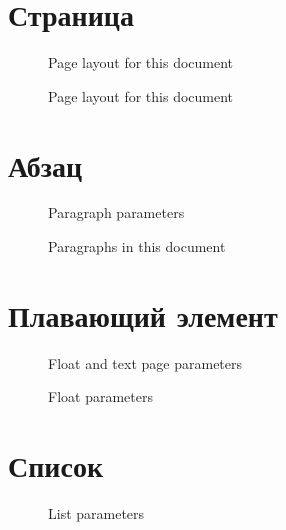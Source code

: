 \documentclass[a4paper,hidelinks,14pt]{extarticle}
\begin{document}
\setuplayouts


\section{Страница}

\begin{figure}
\currentpage
\drawparametersfalse
\drawpage
\caption{Page layout for this document} \label{fig:pplt}
\end{figure}

\begin{figure}
  \currentpage
  \drawparameterstrue
  \drawpage
  \caption{Page layout for this document} \label{fig:ptrs}
\end{figure}

\section{Абзац}

\begin{figure}
\drawparagraph
\caption{Paragraph parameters}\label{fig:fpara}
\end{figure}

\currentparagraph
\begin{figure}
\drawparametersfalse
\drawparagraph
\caption{Paragraphs in this document}\label{fig:dpara}
\end{figure}

\section{Плавающий элемент}

\begin{figure}
\drawfloatpage
\caption{Float and text page parameters}\label{fig:fpp}
\end{figure}


\begin{figure}
\drawparametersfalse
{}
\drawfloat
\caption{Float parameters}\label{fig:fludf}
\end{figure}

\floatvalues

\section{Список}

\begin{figure}
\drawlist
\caption{List parameters} \label{fig:lstp}
\end{figure}
\end{document}
